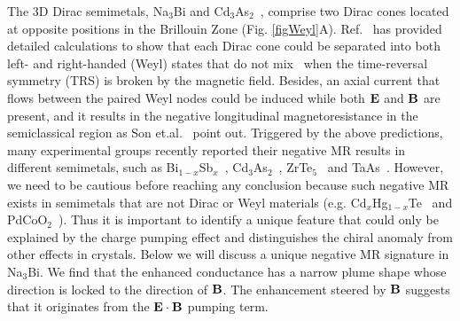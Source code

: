 The 3D Dirac semimetals, Na$_3$Bi and Cd$_3$As$_2$~\cite{Wang2012,Wang2013}, comprise two Dirac cones located at opposite positions in the Brillouin Zone (Fig. \ref{figWeyl}A). Ref.~\cite{Wang2012} has provided detailed calculations to show that each Dirac cone could be separated into both left- and right-handed (Weyl) states that do not mix~\cite{Burkov2011,Yang2011, Aji2012,Son2013,Parameswaran2014,Hosur2013} when the time-reversal symmetry (TRS) is broken by the magnetic field. Besides, an axial current that flows between the paired Weyl nodes could be induced while both $\bf E$ and $\bf B$ are present, and it results in the negative longitudinal magnetoresistance in the semiclassical region as Son et.al.~\cite{Son2013} point out. Triggered by the above predictions, many experimental groups recently reported their negative MR results in different semimetals, such as  Bi$_{1-x}$Sb$_x$~\cite{Kim2013}, Cd$_3$As$_2$~\cite{Liang2015,Zhang2015a}, ZrTe$_5$~\cite{Li2014} and TaAs~\cite{Zhang2015}. However, we need to be cautious before reaching any conclusion because such negative MR exists in semimetals that are not Dirac or Weyl materials (e.g. Cd$_x$Hg$_{1-x}$Te~\cite{HgTe} and PdCoO$_2$~\cite{Kikugawa2014}). Thus it is important to identify a unique feature that could only be explained by the charge pumping effect and distinguishes the chiral anomaly from other effects in crystals. Below we will discuss a unique negative MR signature in Na$_3$Bi. We find that the enhanced conductance has a narrow plume shape whose direction is locked to the direction of $\bf B$. The enhancement steered by $\bf B$ suggests that it originates from the $\bf E\cdot \bf B$ pumping term.





